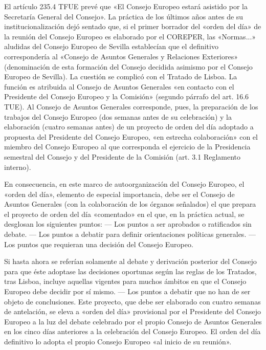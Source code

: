 \documentclass[10pt,a4paper]{article}
\begin{document}
El artículo 235.4 TFUE prevé que «El Consejo Europeo estará asistido por la Secretaría General del Consejo». La práctica de los últimos años antes de su institucionalización dejó sentado que, si el primer borrador del «orden del día» de la reunión del Consejo Europeo es elaborado por el COREPER, las «Normas...» aludidas del Consejo Europeo de Sevilla establecían que el definitivo correspondería al «Consejo de Asuntos Generales y Relaciones Exteriores» (denominación de esta formación del Consejo decidida asimismo por el Consejo Europeo de Sevilla). La cuestión se complicó con el Tratado de Lisboa. La función es atribuida al Consejo de Asuntos Generales «en contacto con el Presidente del Consejo Europeo y la Comisión» (segundo párrafo del art. 16.6 TUE). Al Consejo de Asuntos Generales corresponde, pues, la preparación de los trabajos del Consejo Europeo (dos semanas antes de su celebración) y la elaboración (cuatro semanas antes) de un proyecto de orden del día adoptado a propuesta del Presidente del Consejo Europeo, «en estrecha colaboración» con el miembro del Consejo Europeo al que corresponda el ejercicio de la Presidencia semestral del Consejo y del Presidente de la Comisión (art. 3.1 Reglamento interno).

En consecuencia, en este marco de autoorganización del Consejo Europeo, el «orden del día», elemento de especial importancia, debe ser el Consejo de Asuntos Generales (con la colaboración de los órganos señalados) el que prepara el proyecto de orden del día «comentado» en el que, en la práctica actual, se desglosan los siguientes puntos:
— Los puntos a ser aprobados o ratificados sin debate.
— Los puntos a debatir para definir orientaciones políticas generales.
— Los puntos que requieran una decisión del Consejo Europeo.

Si hasta ahora se referían solamente al debate y derivación posterior del Consejo para que éste adoptase las decisiones oportunas según las reglas de los Tratados, tras Lisboa, incluye aquellas vigentes para muchos ámbitos en que el Consejo Europeo debe decidir por sí mismo.
— Los puntos a debatir que no han de ser objeto de
conclusiones. 
Este proyecto, que debe ser elaborado con cuatro semanas de antelación, se eleva a «orden del día» provisional por el Presidente del Consejo Europeo a la luz del debate celebrado por el propio Consejo de Asuntos Generales en los cinco días anteriores a la celebración del Consejo Europeo. El orden del día definitivo lo adopta el propio Consejo Europeo «al inicio de su reunión».
\end{document}
